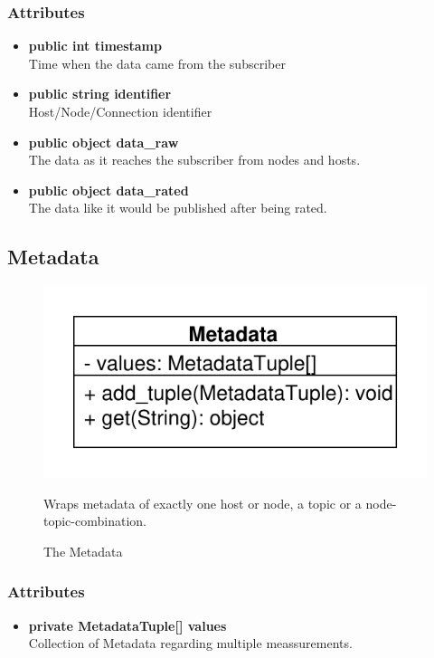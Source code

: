 \subsubsection{Attributes}
\begin{itemize}
	\item \textbf{public int timestamp}\\
	Time when the data came from the subscriber
	\item \textbf{public string identifier}\\
	Host/Node/Connection identifier
	\item \textbf{public object data\_raw}\\
	The data as it reaches the subscriber from nodes and hosts.
	\item \textbf{public object data\_rated}\\
	The data like it would be published after being rated.
\end{itemize}


\subsection{Metadata}
\begin{figure}[htbp]
	\begin{minipage}[t]{7cm}
		\vspace{0pt}
		\centering
		\includegraphics[scale=0.6]{./diagram_pictures/Metadata.pdf}
		\caption{The Metadata}
	\end{minipage}
	\hfill
	\begin{minipage}[t]{8cm}
		\vspace{10pt}
		Wraps metadata of exactly one host or node, a topic or a node-topic-combination.
	\end{minipage}
\end{figure}

\subsubsection{Attributes}
\begin{itemize}
	\item \textbf{private MetadataTuple[] values}\\
	Collection of Metadata regarding multiple meassurements.
\end{itemize}
